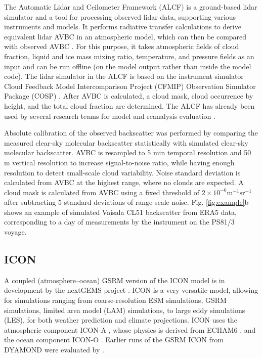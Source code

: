 \documentclass[12pt,a4paper]{article}
\begin{document}
The Automatic Lidar and Ceilometer Framework (ALCF) is a ground-based lidar
simulator and a tool for processing observed lidar data, supporting various
instruments and models. It performs radiative transfer calculations to derive
equivalent lidar AVBC in an atmospheric model, which can then be compared with
observed AVBC \citep{kuma2021}. For this purpose, it takes atmospheric fields
of cloud fraction, liquid and ice mass mixing ratio, temperature, and pressure
fields as an input and can be run offline (on the model output rather than
inside the model code). The lidar simulator in the ALCF is based on the
instrument simulator Cloud Feedback Model Intercomparison Project (CFMIP)
Observation Simulator Package (COSP) \citep{bodas-salcedo2011}.  After AVBC is
calculated, a cloud mask, cloud occurrence by height, and the total cloud
fraction are determined. The ALCF has already been used by several research
teams for model and reanalysis evaluation
\citep{kuma2020,kremser2021,guyot2022,pei2023,whitehead2023,mcdonald2024}.

Absolute calibration of the observed backscatter was performed by comparing the
measured clear-sky molecular backscatter statistically with simulated clear-sky
molecular backscatter. AVBC is resampled to 5 min temporal resolution and 50 m
vertical resolution to increase signal-to-noise ratio, while having enough
resolution to detect small-scale cloud variability. Noise standard deviation is
calculated from AVBC at the highest range, where no clouds are expected.  A
cloud mask is calculated from AVBC using a fixed threshold of $\mathrm{2\times
10^{-6} m^{-1}sr^{-1}}$ after subtracting 5 standard deviations of range-scale
noise. Fig. \ref{fig:example}b shows an example of simulated Vaisala CL51
backscatter from ERA5 data, corresponding to a day of measurements by the
instrument on the PS81/3 voyage.

\subsection{ICON}

A coupled (atmosphere--ocean) GSRM version of the ICON model is in development
by the nextGEMS project \citep{hohenegger2023}. ICON is a very versatile model,
allowing for simulations ranging from coarse-resolution ESM simulations, GSRM
simulations, limited area model (LAM) simulations, to large eddy simulations
(LES), for both weather prediction and climate projections. ICON uses the
atmospheric component ICON-A \citep{giorgetta2018}, whose physics is derived
from ECHAM6 \citep{stevens2013}, and the ocean component ICON-O
\citep{korn2022}. Earlier runs of the GSRM ICON from DYAMOND were evaluated by
\cite{mauritsen2022}.
\end{document}
